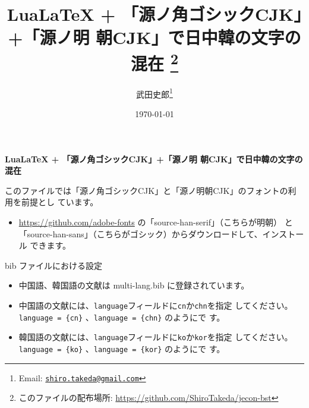 \documentclass{ltjsarticle}
\title{\textbf{LuaLaTeX + 「源ノ角ゴシックCJK」+「源ノ明
 朝CJK」で日中韓の文字の混在}
\thanks{このファイルの配布場所: \url{https://github.com/ShiroTakeda/jecon-bst}}
}
\author{武田史郎\thanks{Email:
\texttt{\href{mailto:shiro.takeda@gmail.com}{shiro.takeda@gmail.com}}}}
\date{\today}
\begin{document}

\begin{flushleft}
{\Large \textbf{LuaLaTeX + 「源ノ角ゴシックCJK」+「源ノ明
 朝CJK」で日中韓の文字の混在}} 
\end{flushleft}

\vspace*{1em}

このファイルでは「源ノ角ゴシックCJK」と「源ノ明朝CJK」のフォントの利用を前提とし
ています。
\begin{itemize}
 \item \url{https://github.com/adobe-fonts} の「source-han-serif」（こちらが明朝）
       と「source-han-sans」（こちらがゴシック）からダウンロードして、インストール
       できます。
\end{itemize}

\vspace*{1em}

bib ファイルにおける設定
\begin{itemize}
 \item 中国語、韓国語の文献は multi-lang.bib に登録されています。
 \item 中国語の文献には、\verb|language|フィールドに\verb|cn|か\verb|chn|を指定
       してください。\verb|language = {cn}| 、\verb|language = {chn}| のようにで
       す。
 \item 韓国語の文献には、\verb|language|フィールドに\verb|ko|か\verb|kor|を指定
       してください。\verb|language = {ko}| 、\verb|language = {kor}| のようにで
       す。
\end{itemize}
\end{document}

